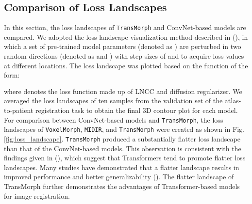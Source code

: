 \documentclass[times,twocolumn,final]{elsarticle}
\begin{document}
\subsection{Comparison of Loss Landscapes}
In this section, the loss landscapes of \texttt{TransMorph} and ConvNet-based models are compared. We adopted the loss landscape visualization method described in (\cite{li2018visualizing, goodfellow2014qualitatively, im2016empirical}), in which a set of pre-trained model parameters (denoted as ) are perturbed in two random directions (denoted as  and ) with step sizes of  and  to acquire loss values at different locations. The loss landscape was plotted based on the function of the form:
\begin{linenomath}

\end{linenomath}
where  denotes the loss function made up of LNCC and diffusion regularizer. We averaged the loss landscapes of ten samples from the validation set of the atlas-to-patient registration task to obtain the final 3D contour plot for each model. For comparison between ConvNet-based models and \texttt{TransMorph}, the loss landscapes of \texttt{VoxelMorph}, \texttt{MIDIR}, and \texttt{TransMorph} were created as shown in Fig. \ref{fig:loss_landscape}. \texttt{TransMorph} produced a substantially flatter loss landscape than that of the ConvNet-based models. This observation is consistent with the findings given in (\cite{park2022vision}), which suggest that Transformers tend to promote flatter loss landscapes. Many studies have demonstrated that a flatter landscape results in improved performance and better generalizability (\cite{park2022vision, keskar2016large, santurkar2018does, foret2020sharpness, li2018visualizing}). The flatter landscape of TransMorph further demonstrates the advantages of Transformer-based models for image registration.
\end{document}
